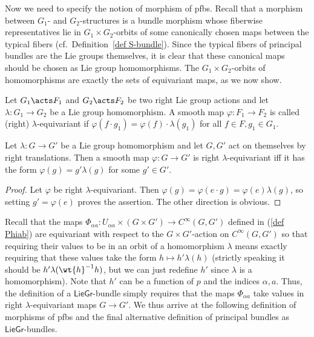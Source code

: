 Now we need to specify the notion of morphism of \glspl{pfb}. Recall that a morphism between $G_1$- and $G_2$-structures is a bundle morphism whose fiberwise representatives lie in $G_1\times G_2$-orbits of some canonically chosen maps between the typical fibers (cf.\ Definition~\ref{def S-bundle}). Since the typical fibers of principal bundles are the Lie groups themselves, it is clear that these canonical maps should be chosen as Lie group homomorphisms. The $G_1\times G_2$-orbits of homomorphisms are exactly the sets of equivariant maps, as we now show. 

\begin{defn}
    Let $G_1\acts F_1$ and $G_2\acts F_2$ be two right Lie group actions and let $\lambda:G_1\to G_2$ be a Lie group homomorphism. A smooth map $\varphi:F_1\to F_2$ is called (right) $\lambda$-equivariant if $\varphi(f\cdot g_1)=\varphi(f)\cdot \lambda(g_1)$ for all $f\in F,g_1\in G_1$.
\end{defn}

\begin{prop}
    Let $\lambda:G\to G'$ be a Lie group homomorphism and let $G,G'$ act on themselves by right translations. Then a smooth map $\varphi:G\to G'$ is right $\lambda$-equivariant iff it has the form $\varphi(g)=g'\lambda(g)$ for some $g'\in G'$.
\end{prop}
\begin{proof}
    Let $\varphi$ be right $\lambda$-equivariant. Then
    $\varphi(g)=\varphi(e\cdot g)=\varphi(e)\lambda(g)$,
    so setting $g'=\varphi(e)$ proves the assertion. The other direction is obvious.
\end{proof}


Recall that the maps $\Phi_{\alpha a}:U_{\alpha a}\times (G\times G')\to C^\infty(G,G')$ defined in (\ref{def Phiab}) are equivariant with respect to the $G\times G'$-action on $C^\infty(G,G')$ so that requiring their values to be in an orbit of a homomorphism $\lambda$ means exactly requiring that these values take the form $h\mapsto h'\lambda (h)$ (strictly speaking it should be $h'\lambda(\wt{h}^{-1}h)$, but we can just redefine $h'$ since $\lambda$ is a homomorphism). Note that $h'$ can be a function of $p$ and the indices $\alpha,a$. Thus, the definition of a $\mathsf{LieGr}$-bundle simply requires that the maps $\Phi_{\alpha a}$ take values in right $\lambda$-equivariant maps $G\to G'$. We thus arrive at the following definition of morphisms of \glspl{pfb} and the final alternative definition of principal bundles as $\mathsf{LieGr}$-bundles.

